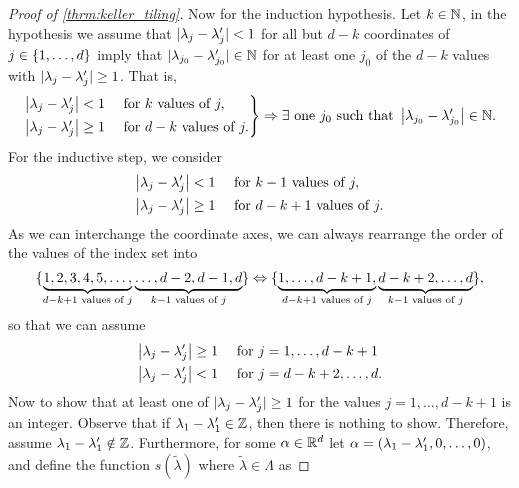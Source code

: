 \documentclass[../thesis.tex]{subfiles}
\begin{document}
\begin{proof}[Proof of \cref{thrm:keller_tiling}]
    Now for the induction hypothesis. Let $k\in \mathbb{N}$, in the hypothesis we assume that $|\lambda_{j}-\lambda_{j}'| < 1$ for all but $d-k$ coordinates of $j\in\{1,\dots, d\}$ imply that $|\lambda_{j_0}-\lambda_{j_0}'| \in \mathbb{N}$ for at least one $j_0$ of the $d-k$ values with $|\lambda_{j}-\lambda_{j}'| \geq 1$. That is,
    \begin{align*}
        \begin{rcases}
            \left|\lambda_{j}-\lambda_{j}'\right| < 1 & \text{ for $k$ values of } j , \\
            \left|\lambda_{j}-\lambda_{j}'\right| \geq 1 & \text{ for $d-k$ values of } j .
        \end{rcases}
        \Rightarrow \exists \text{ one } j_0 \text{ such that } \left|\lambda_{j_0}-\lambda_{j_0}'\right| \in \mathbb{N}.
    \end{align*}
    For the inductive step, we consider
    \begin{align*}
        \left|\lambda_{j}-\lambda_{j}'\right| < 1& \quad \text{ for $k-1$ values of } j , \\
        \left|\lambda_{j}-\lambda_{j}'\right| \geq 1& \quad \text{ for $d-k+1$ values of } j .
    \end{align*}
    As we can interchange the coordinate axes, we can always rearrange the order of the values of the index set into
    \begin{equation*}
        \{\underbrace{1,2,3,4,5,\dots,}_{d-k+1 \text{ values of $j$}}\underbrace{\dots,d-2,d-1,d}_{k-1 \text{ values of $j$}}\} \Leftrightarrow \{\underbrace{1,\dots,d-k+1,}_{d-k+1 \text{ values of $j$}}\underbrace{d-k+2,\dots,d}_{k-1 \text{ values of $j$}}\},
    \end{equation*} 
    so that we can assume
    \begin{align*}
        \left|\lambda_{j}-\lambda_{j}'\right| \geq 1& \quad \text{ for } j=1,\dots,d-k+1 \\
        \left|\lambda_{j}-\lambda_{j}'\right| < 1& \quad \text{ for } j= d-k+2,\dots,d.
    \end{align*}
    Now to show that at least one of $|\lambda_{j}-\lambda_{j}'| \geq 1$ for the values $j=1,\dots,d-k+1$ is an integer. Observe that if $\lambda_{1}-\lambda_{1}'\in\mathbb{Z}$, then there is nothing to show. Therefore, assume $\lambda_{1}-\lambda_{1}' \notin \mathbb{Z}$. Furthermore, for some $\alpha\in\mathbb{R}^d$ let $\alpha = (\lambda_{1}-\lambda_{1}',0,\dots,0)$, and define the function $s(\tilde{\lambda})$ where $\tilde{\lambda}\in \Lambda$ as

\end{proof}
\end{document}
